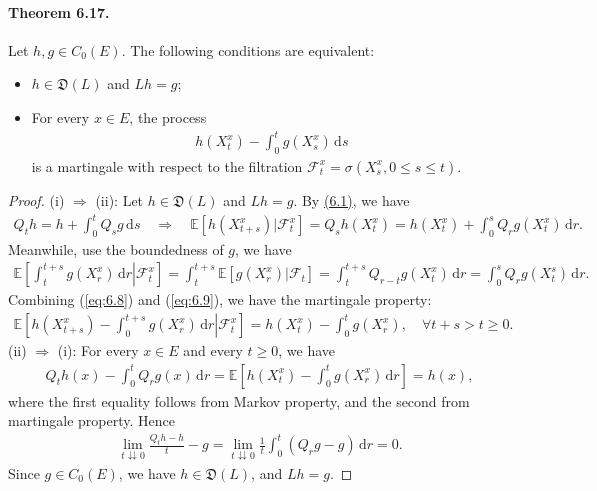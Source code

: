 \documentclass{article}
\numberwithin{equation}{section}
\newcommand{\E}{\mathbb{E}}
\renewcommand{\d}{\mathrm{d}}
\theoremstyle{plain}
\theoremstyle{definition}
\begin{document}
\paragraph{Theorem 6.17.\label{thm:6.17}} Let $h,g\in C_0(E)$. The following conditions are equivalent:
\begin{itemize}
	\item[(i)] $h\in\mathfrak{D}(L)$ and $Lh=g$;
	\item[(ii)] For every $x\in E$, the process
	\begin{align*}
		h(X_t^x) - \int_0^t g(X_s^x)\,\d s
	\end{align*}
	is a martingale with respect to the filtration $\mathscr{F}_t^x = \sigma(X_s^x,0\leq s\leq t)$.
\end{itemize}
\begin{proof}
	(i) $\Rightarrow$ (ii): Let $h\in\mathfrak{D}(L)$ and $Lh=g$. By \hyperref[eq:6.1]{(6.1)}, we have
	\begin{align*}
		Q_th = h+\int_0^t Q_sg\,\d s \quad\Rightarrow\quad \E\left[h(X_{t+s}^x)|\mathscr{F}_t^x\right]=Q_sh(X_t^x)=h(X_t^x)+\int_0^s Q_rg(X_t^x)\,\d r.\tag{6.8}\label{eq:6.8}
	\end{align*}
	Meanwhile, use the boundedness of $g$, we have
	\begin{align*}
		\E\left[\left.\int_t^{t+s}g(X_r^x)\,\d r\right|\mathscr{F}_t^x\right] = \int_t^{t+s}\E\left[g(X_r^x)|\mathscr{F}_t\right]=\int_t^{t+s}Q_{r-t}g(X_t^x)\,\d r = \int_0^s Q_rg(X_t^s)\,\d r.\tag{6.9}\label{eq:6.9}
	\end{align*}
	Combining (\ref{eq:6.8}) and (\ref{eq:6.9}), we have the martingale property:
	\begin{align*}
		\E\left[\left.h(X_{t+s}^x)-\int_0^{t+s}g(X_r^x)\,\d r\right|\mathscr{F}_t^x\right]=h(X_t^x) - \int_0^tg(X_r^x),\quad\forall t+s > t\geq 0.
	\end{align*}
	(ii) $\Rightarrow$ (i): For every $x\in E$ and every $t\geq 0$, we have
	\begin{align*}
		Q_th(x) - \int_0^t Q_rg(x)\,\d r=\E\left[h(X_t^x)-\int_0^tg(X_r^x)\,\d r\right] = h(x),
	\end{align*}
	where the first equality follows from Markov property, and the second from martingale property. Hence
	\begin{align*}
		\lim_{t\downdownarrows 0}\frac{Q_th-h}{t} - g =\lim_{t\downdownarrows 0}\frac{1}{t}\int_0^t (Q_rg - g)\,\d r = 0.
	\end{align*}
	Since $g\in C_0(E)$, we have $h\in\mathfrak{D}(L)$, and $Lh=g$.
\end{proof}
\end{document}
